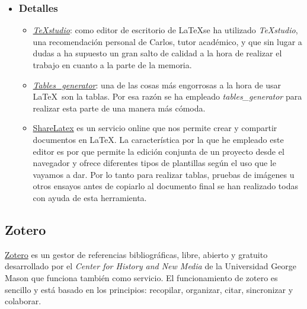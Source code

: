    \begin{itemize}
  	\item \subsubsection{Detalles}
  	\begin{itemize}
  		\item \href{https://www.texstudio.org}{\textit{TeXstudio}}: como editor de escritorio de La\TeX se ha utilizado \textit{TeXstudio}, una recomendación personal de Carlos, tutor académico, y que sin lugar a dudas a ha supuesto un gran salto de calidad a la hora de realizar el trabajo en cuanto a la parte de la memoria.
  		\item \href{http://www.tablesgenerator.com/latex_tables}{\textit{Tables\_generator}}: una de las cosas más engorrosas a la hora de usar La\TeX\  son la tablas. Por esa razón se ha empleado \textit{tables\_generator} para realizar esta parte de una manera más cómoda. 
  		\item \href{https://es.sharelatex.com/}{ShareLatex}  es un servicio online que nos permite crear y compartir documentos en La\TeX. La característica por la que he empleado este editor es por que  permite la edición conjunta de un proyecto desde el navegador y ofrece diferentes tipos de plantillas según el uso que le vayamos a dar. Por lo tanto para realizar tablas, pruebas de imágenes u otros ensayos antes de copiarlo al documento final se han realizado todas con ayuda de esta herramienta.
  	\end{itemize}
  \end{itemize}
  
 \subsection{Zotero}\label{docs_zotero}
 \href{https://www.zotero.org/}{Zotero} es un gestor de referencias bibliográficas, libre, abierto y gratuito desarrollado por el \textit{Center for History and New Media} de la Universidad George Mason que funciona también como servicio. El funcionamiento de zotero es sencillo y está basado en los principios: recopilar, organizar, citar, sincronizar y colaborar.
  
  
